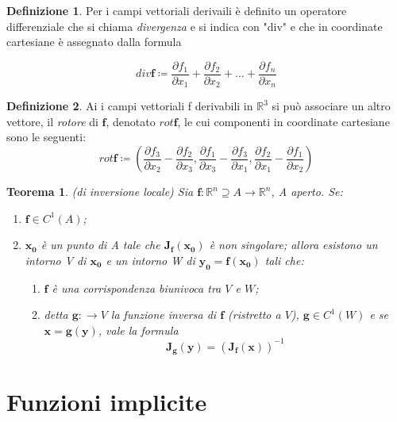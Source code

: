 \documentclass[a4paper]{book}
\numberwithin{equation}{section}
\theoremstyle{plain}
\newtheorem{teor}{Teorema}[section]
\theoremstyle{definition}
\newtheorem{defn}{Definizione}[section]
\theoremstyle{remark}
\renewcommand{\vec}{\boldsymbol}
\theoremstyle{example}
\begin{document}
\begin{defn}
	Per i campi vettoriali derivaili è definito un operatore differenziale che si chiama \textit{divergenza} e si indica con "div" e che in coordinate cartesiane è assegnato dalla formula

	\begin{equation}
		div \vec{f} \coloneqq \frac{\partial{f_1}}{\partial{x_1}} + \frac{\partial{f_2}}{\partial{x_2}}+ ... + \frac{\partial{f_n}}{\partial{x_n}}
	\end{equation}
\end{defn}
\begin{defn}
	Ai i campi vettoriali f derivabili in $\mathbb{R}^3$ si può associare un altro vettore, il \textit{rotore} di $\vec{f}$, denotato $rot \vec{f}$, le  cui componenti in coordinate cartesiane sono le seguenti:
	\begin{equation}
		rot \vec{f} \coloneqq (\frac{\partial{f_3}}{\partial{x_2}}-\frac{\partial{f_2}}{\partial{x_3}},\frac{\partial{f_1}}{\partial{x_3}}-\frac{\partial{f_3}}{\partial{x_1}},\frac{\partial{f_2}}{\partial{x_1}}-\frac{\partial{f_1}}{\partial{x_2}})
	\end{equation}
\end{defn}

\begin{teor}(di inversione locale)
	Sia $\vec{f}:\mathbb{R}^n \supseteq  A \rightarrow  \mathbb{R}^n$, A aperto. Se:
	\begin{enumerate}
		\item $\vec{f} \in C^1(A)$;
		\item $\vec{x_0}$ è un punto di A tale che $\vec{J_f(x_0)}$ è non singolare;
		allora esistono un intorno V di $\vec{x_0}$ e un intorno W di $\vec{y_0} = \vec{f(x_0)}$ tali che:
		\begin{enumerate}
			\item $\vec{f}$ è una corrispondenza biunivoca tra $V$ e $W$;
			\item detta $\vec{g}:\rightarrow V$ la funzione inversa di $\vec{f}$ (ristretto a $V$), $\vec{g} \in C^1(W)$ e se $\vec{x} = \vec{g(y)}$, vale la formula
			\begin{equation}
				\vec{J_g(y)} = (\vec{J_f(x)})^{-1}
			\end{equation}
		\end{enumerate}
	\end{enumerate}
\end{teor}

\section{Funzioni implicite}
\end{document}
